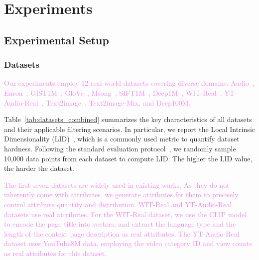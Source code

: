 \documentclass[sigconf, nonacm]{acmart}
\begin{document}
{%
	
	\section{Experiments}
	\subsection{Experimental Setup}
	\subsubsection{Datasets}
	
	\textcolor{violet}{Our experiments employ 12 real-world datasets covering diverse domains: Audio~\cite{audio_unknown},  Enron~\cite{enron2015}, GIST1M~\cite{sift2010}, GloVe~\cite{GloVe2015}, Msong~\cite{msong2011}, SIFT1M~\cite{sift2010}, Deep1M~\cite{yandex_deep_dataset}, WIT-Real~\cite{wit_dataset}, YT-Audio-Real~\cite{youtube8m_dataset}, Text2image~\cite{texttoimage}, Text2image-Mix, and Deep100M.}
	
	Table~\ref{tab:datasets_combined} summarizes the key characteristics of all datasets and their applicable filtering scenarios. In particular, we report the Local Intrinsic Dimensionality (LID)~\cite{Lid}, which is a commonly used metric to quantify dataset hardness. Following the standard evaluation protocol~\cite{LID2}, we randomly sample 10,000 data points from each dataset to compute LID. The higher the LID value, the harder the dataset.
	
	\textcolor{violet}{The first seven datasets are widely used in existing works. As they do not inherently come with attributes, we generate attributes for them to precisely control attribute quantity and distribution. WIT-Real and YT-Audio-Real datasets use real attributes. For the WIT-Real dataset, we use the CLIP model to encode the page title into vectors, and extract the language type and the length of the context page description  as real attributes. The YT-Audio-Real dataset uses YouTube8M data, employing the video category ID and view counts as real attributes for this dataset.}
	
}
\end{document}
